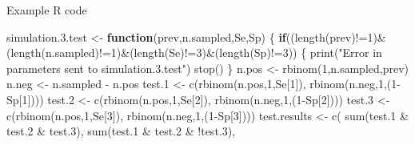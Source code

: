 \documentclass[
  ignorenonframetext,
]{beamer}
\newenvironment{Shaded}{\begin{snugshade}}{\end{snugshade}}
\newcommand{\ControlFlowTok}[1]{\textcolor[rgb]{0.13,0.29,0.53}{\textbf{#1}}}
\newcommand{\DecValTok}[1]{\textcolor[rgb]{0.00,0.00,0.81}{#1}}
\newcommand{\FloatTok}[1]{\textcolor[rgb]{0.00,0.00,0.81}{#1}}
\newcommand{\FunctionTok}[1]{\textcolor[rgb]{0.00,0.00,0.00}{#1}}
\newcommand{\NormalTok}[1]{#1}
\newcommand{\OtherTok}[1]{\textcolor[rgb]{0.56,0.35,0.01}{#1}}
\newcommand{\SpecialCharTok}[1]{\textcolor[rgb]{0.00,0.00,0.00}{#1}}
\newcommand{\StringTok}[1]{\textcolor[rgb]{0.31,0.60,0.02}{#1}}
\begin{document}
\begin{frame}[fragile]{Example R code}
\protect\hypertarget{example-r-code}{}
\begin{Shaded}
\begin{Highlighting}[]
\NormalTok{simulation.}\FloatTok{3.}\NormalTok{test }\OtherTok{\textless{}{-}} \ControlFlowTok{function}\NormalTok{(prev,n.sampled,Se,Sp) \{}
  \ControlFlowTok{if}\NormalTok{((}\FunctionTok{length}\NormalTok{(prev)}\SpecialCharTok{!=}\DecValTok{1}\NormalTok{)}\SpecialCharTok{\&}\NormalTok{(}\FunctionTok{length}\NormalTok{(n.sampled)}\SpecialCharTok{!=}\DecValTok{1}\NormalTok{)}\SpecialCharTok{\&}\NormalTok{(}\FunctionTok{length}\NormalTok{(Se)}\SpecialCharTok{!=}\DecValTok{3}\NormalTok{)}\SpecialCharTok{\&}\NormalTok{(}\FunctionTok{length}\NormalTok{(Sp)}\SpecialCharTok{!=}\DecValTok{3}\NormalTok{)) \{}
    \FunctionTok{print}\NormalTok{(}\StringTok{"Error in parameters sent to simulation.3.test"}\NormalTok{)}
    \FunctionTok{stop}\NormalTok{()}
\NormalTok{  \}}
\NormalTok{  n.pos }\OtherTok{\textless{}{-}} \FunctionTok{rbinom}\NormalTok{(}\DecValTok{1}\NormalTok{,n.sampled,prev)}
\NormalTok{  n.neg }\OtherTok{\textless{}{-}}\NormalTok{ n.sampled }\SpecialCharTok{{-}}\NormalTok{ n.pos}
\NormalTok{  test}\FloatTok{.1} \OtherTok{\textless{}{-}} \FunctionTok{c}\NormalTok{(}\FunctionTok{rbinom}\NormalTok{(n.pos,}\DecValTok{1}\NormalTok{,Se[}\DecValTok{1}\NormalTok{]), }\FunctionTok{rbinom}\NormalTok{(n.neg,}\DecValTok{1}\NormalTok{,(}\DecValTok{1}\SpecialCharTok{{-}}\NormalTok{Sp[}\DecValTok{1}\NormalTok{])))}
\NormalTok{  test}\FloatTok{.2} \OtherTok{\textless{}{-}} \FunctionTok{c}\NormalTok{(}\FunctionTok{rbinom}\NormalTok{(n.pos,}\DecValTok{1}\NormalTok{,Se[}\DecValTok{2}\NormalTok{]), }\FunctionTok{rbinom}\NormalTok{(n.neg,}\DecValTok{1}\NormalTok{,(}\DecValTok{1}\SpecialCharTok{{-}}\NormalTok{Sp[}\DecValTok{2}\NormalTok{])))}
\NormalTok{  test}\FloatTok{.3} \OtherTok{\textless{}{-}} \FunctionTok{c}\NormalTok{(}\FunctionTok{rbinom}\NormalTok{(n.pos,}\DecValTok{1}\NormalTok{,Se[}\DecValTok{3}\NormalTok{]), }\FunctionTok{rbinom}\NormalTok{(n.neg,}\DecValTok{1}\NormalTok{,(}\DecValTok{1}\SpecialCharTok{{-}}\NormalTok{Sp[}\DecValTok{3}\NormalTok{])))}
\NormalTok{  test.results }\OtherTok{\textless{}{-}} \FunctionTok{c}\NormalTok{(}
    \FunctionTok{sum}\NormalTok{(test}\FloatTok{.1} \SpecialCharTok{\&}\NormalTok{ test}\FloatTok{.2} \SpecialCharTok{\&}\NormalTok{ test}\FloatTok{.3}\NormalTok{),}
    \FunctionTok{sum}\NormalTok{(test}\FloatTok{.1} \SpecialCharTok{\&}\NormalTok{ test}\FloatTok{.2} \SpecialCharTok{\&} \SpecialCharTok{!}\NormalTok{test}\FloatTok{.3}\NormalTok{),}

\end{Highlighting}
\end{Shaded}
\end{frame}
\end{document}
